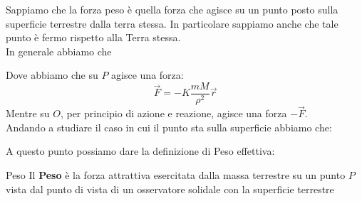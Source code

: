 \documentclass[11pt,a4paper,twoside]{article}
\theoremstyle{definition}
\begin{document}
Sappiamo che la forza peso è quella forza che agisce su un punto posto sulla superficie terrestre dalla terra stessa. In particolare sappiamo anche che tale punto è fermo rispetto alla Terra stessa.\\
In generale abbiamo che
\begin{center}
\end{center}
Dove abbiamo che su $P$ agisce una forza:
\[ \vec F = -K \frac{mM}{\rho^2}\vec r \]
Mentre su $O$, per principio di azione e reazione, agisce una forza $-\vec F$.\\
Andando a studiare il caso in cui il punto sta sulla superficie abbiamo che:
\begin{center}
\end{center}
A questo punto possiamo dare la definizione di Peso effettiva:

\begin{defn}{Peso}{}
	Il \textbf{Peso} è la forza attrattiva esercitata dalla massa terrestre su un punto $P$ vista dal punto di vista di un osservatore solidale con la superficie terrestre
\end{defn}
\end{document}
